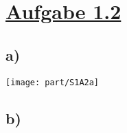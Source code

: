 \section*{\underline{Aufgabe 1.2}}

\subsection*{a)}

\texttt{[image: part/S1A2a]}

\subsection*{b)}